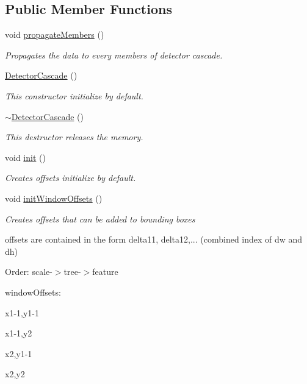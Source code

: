 \subsection*{Public Member Functions}
\begin{DoxyCompactItemize}
\item 
void \hyperlink{classtld_1_1DetectorCascade_a809e13a6c7fbc1c13dcb9b4bf9d22964}{propagate\-Members} ()
\begin{DoxyCompactList}\small\item\em Propagates the data to every members of detector cascade. \end{DoxyCompactList}\item 
\hyperlink{classtld_1_1DetectorCascade_a709b4d4802e4f8391fad8fd1b6f892eb}{Detector\-Cascade} ()
\begin{DoxyCompactList}\small\item\em This constructor initialize by default. \end{DoxyCompactList}\item 
\hyperlink{classtld_1_1DetectorCascade_a1154ee7d1fd731055af1f6b5b697d8ba}{$\sim$\-Detector\-Cascade} ()
\begin{DoxyCompactList}\small\item\em This destructor releases the memory. \end{DoxyCompactList}\item 
void \hyperlink{classtld_1_1DetectorCascade_a98d5393088a53188dcde7d530101534a}{init} ()
\begin{DoxyCompactList}\small\item\em Creates offsets initialize by default. \end{DoxyCompactList}\item 
void \hyperlink{classtld_1_1DetectorCascade_a39760d6c54ddb41785ffd05a7b881d8d}{init\-Window\-Offsets} ()
\begin{DoxyCompactList}\small\item\em Creates offsets that can be added to bounding boxes \par
 offsets are contained in the form delta11, delta12,... (combined index of dw and dh) \par
 Order\-: scale-\/$>$tree-\/$>$feature \par
 window\-Offsets\-: \par
 x1-\/1,y1-\/1 \par
 x1-\/1,y2 \par
 x2,y1-\/1 \par
 x2,y2 \par

\end{DoxyCompactList}
\end{DoxyCompactItemize}
